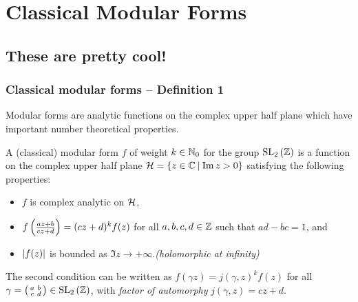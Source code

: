 \section{Classical Modular Forms}


\subsection{These are pretty cool!}

\begin{frame} \frametitle{Classical modular forms -- Definition 1}
  Modular forms are analytic functions on the complex upper half plane which have important number theoretical properties. \pause
  \begin{definition}
    A (classical) modular form $f$ of weight $k \in \NNO$ for the group $\SL[2]{\ZZ}$ is a function on the complex upper half plane $\HH = \setst{z \in \CC}{\Im{z} > 0}$ satisfying the following properties: \pause
    \begin{itemize}
      \item $f$ is complex analytic on $\HH$\pause,
      \item $f\parens{\frac{az+b}{cz+d}} = (cz+d)^{k} f(z)$ for all $a,b,c,d \in \ZZ$ such that $ad-bc = 1$\pause, and
      \item $\abs{f(z)}$ is bounded as $\Im{z} \to +\infty$.\pause \hfill \emph{(holomorphic at infinity)}
    \end{itemize}
  \end{definition}

  The second condition can be written as $f(\gamma z) = j(\gamma,z)^{k} f(z)$ for all $\gamma = \parens{\begin{smallmatrix} a & b \\ c & d \end{smallmatrix}} \in \SL[2]{\ZZ}$, with \emph{factor of automorphy} $j(\gamma,z) = cz+d$.
\end{frame}


